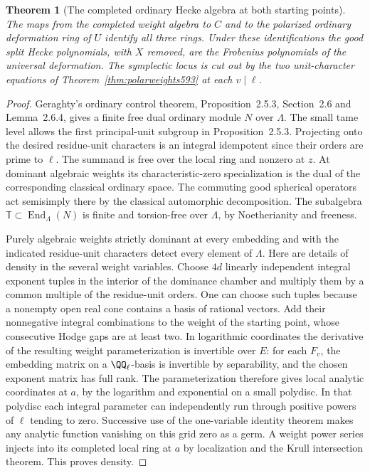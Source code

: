 \documentclass[a4paper,11pt]{article}
\newtheorem{theorem}[proposition]{Theorem}
\theoremstyle{definition}
\theoremstyle{remark}
\numberwithin{equation}{section}
\begin{document}
\begin{theorem}[The completed ordinary Hecke algebra at both starting points]
\leavevmode\label{thm:heckeseeds595}
The maps from the completed weight algebra to \(C\) and to the
polarized ordinary deformation ring of \(U\) identify all
three rings. Under these identifications the good split
Hecke polynomials, with \(X\) removed, are the Frobenius
polynomials of the universal deformation. The symplectic
locus is cut out by the two unit-character equations of
Theorem~\ref{thm:polarweights593} at each \(v\mid\ell\).
\end{theorem}
\begin{proof}
Geraghty's ordinary control theorem, Proposition~2.5.3,
Section~2.6 and Lemma~2.6.4, gives a finite free dual
ordinary module \(N\) over \(\Lambda\). The small tame level
allows the first principal-unit subgroup in Proposition~2.5.3.
Projecting onto the desired residue-unit characters is an
integral idempotent since their orders are prime to \(\ell\).
The summand is free over the local ring and nonzero at \(z\).
At dominant algebraic weights its characteristic-zero
specialization is the dual of the corresponding classical
ordinary space. The commuting good spherical operators act
semisimply there by the classical automorphic decomposition.
The subalgebra \(\mathbb T\subset\operatorname{End}_\Lambda(N)\)
is finite and torsion-free over \(\Lambda\), by Noetherianity
and freeness. \cite{XII-IX-geraghty363}

Purely algebraic weights strictly dominant at every embedding
and with the indicated residue-unit characters detect every
element of \(\Lambda\). Here are details of density in the
several weight variables. Choose \(4d\) linearly independent
integral exponent tuples in the interior of the dominance
chamber and multiply them by a common multiple of the
residue-unit orders. One can choose such tuples because a
nonempty open real cone contains a basis of rational vectors.
Add their nonnegative integral combinations to the weight of
the starting point, whose consecutive Hodge gaps are at least
two. In logarithmic coordinates the derivative of the resulting
weight parameterization is invertible over \(E\): for each
\(F_v\), the embedding matrix on a \(\QQ_\ell\)-basis is
invertible by separability, and the chosen exponent matrix
has full rank. The parameterization therefore gives local
analytic coordinates at \(a\), by the logarithm and exponential
on a small polydisc. In that polydisc each integral parameter
can independently run through positive powers of \(\ell\)
tending to zero. Successive use of the one-variable identity
theorem makes any analytic function vanishing on this grid
zero as a germ. A weight power series injects into its
completed local ring at \(a\) by localization and the Krull
intersection theorem. This proves density.


\end{proof}
\end{document}
